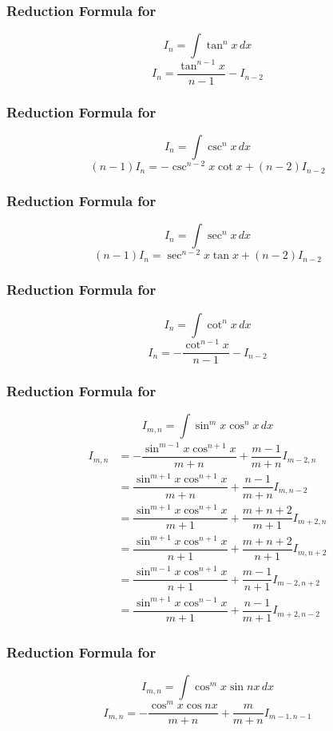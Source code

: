 \documentclass{article}
\begin{document}
\subsubsection{Reduction Formula for }
$$I_{n}=\displaystyle\int \tan^n x \, dx$$
$$I_{n}=\dfrac{\tan^{n-1} x}{n-1}-I_{n-2}$$
\subsubsection{Reduction Formula for }
$$I_{n}=\displaystyle\int \csc^n x \, dx$$
$$(n-1)I_{n}=-\csc^{n-2} x\cot x +(n-2) I_{n-2}$$
\subsubsection{Reduction Formula for }
$$I_{n}=\displaystyle\int \sec^n x \, dx$$
$$(n-1)I_{n}=\sec^{n-2} x \tan x + (n-2)I_{n-2}$$
\subsubsection{Reduction Formula for }
$$I_{n}=\displaystyle\int \cot^n x \, dx$$
$$I_{n}=-\dfrac{\cot^{n-1}x}{n-1} - I_{n-2}$$
\subsubsection{Reduction Formula for }
$$I_{m,n}=\displaystyle\int \sin^m x \cos^n x \, dx$$
\begin{equation*}
    \begin{split}
        I_{m,n} &= - \dfrac{\sin^{m-1} x \cos^{n+1} x}{m+n}+\dfrac{m-1}{m+n}I_{m-2,n} \\[2mm]
        &= \dfrac{\sin^{m+1} x \cos^{n+1} x}{m+n}+\dfrac{n-1}{m+n} I_{m,n-2}\\
        &= \dfrac{\sin^{m+1}x \cos^{n+1} x}{m+1} + \dfrac{m+n+2}{m+1}I_{m+2,n}\\
        &= \dfrac{\sin^{m+1} x \cos^{n+1} x }{n+1} + \dfrac{m+n+2}{n+1} I_{m,n+2}\\
        &= \dfrac{\sin^{m-1}x \cos^{n+1}x}{n+1} + \dfrac{m-1}{n+1} I_{m-2,n+2}\\
        &= \dfrac{\sin^{m+1}x \cos^{n-1}x}{m+1} + \dfrac{n-1}{m+1}I_{m+2,n-2}
    \end{split}
\end{equation*}
\subsubsection{Reduction Formula for }
$$I_{m,n}=\displaystyle\int \cos^m x \sin nx  \, dx$$
$$I_{m,n}=-\dfrac{\cos^m x \cos nx }{m+n} + \dfrac{m}{m+n} I_{m-1,n-1}$$
\end{document}
